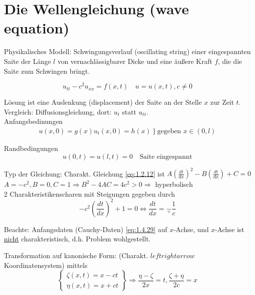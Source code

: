 \section{Die Wellengleichung (wave equation)} %
Physikalisches Modell: Schwingungsverlauf (oscillating string) einer eingespannten Saite der Länge $l$ von vernachlässigbarer Dicke und eine äußere Kraft $f$, die die Saite zum Schwingen bringt. 

\begin{equation} %
    u_{tt} - c^2u_{xx} = f(x,t) \quad u=u(x,t), c\neq 0
    \label{}
\end{equation}

Lösung ist eine Auslenkung (displacement) der Saite an der Stelle $x$ zur Zeit $t$. Vergleich: Diffusionsgleichung, dort: $u_t$ statt $u_{tt}$.\\

Anfangsbedinungen 
\begin{equation} %
    \label{}
    \begin{aligned}
        \left.
            u(x,0) = g(x)
            u_t(x,0) = h(x) 
        \right\} \text{gegeben } x\in(0,l)
    \end{aligned}
\end{equation}

Randbedingungen
\begin{equation} %
    u(0,t) = u(l,t) = 0 \quad \text{Saite eingespannt}
    \label{}
\end{equation}

Typ der Gleichung: Charakt. Gleichung \eqref{eq:1.2.12} ist $A(\frac{dt}{dx})^2 -B(\frac{dt}{dx}) + C = 0$
$A=-c^2, B=0, C=1 \Rightarrow B^2-4AC = 4c^2 > 0 \Rightarrow$  hyperbolisch\\

2 Charakteristikenscharen mit Steigungen gegeben durch 
\begin{equation}
    -c^2 (\frac{dt}{dx})^2 + 1 = 0 \Leftrightarrow \frac{dt}{dx} = \underset{+}{-} \frac{1}{c}
    \label{}
\end{equation}

Beachte: Anfangsdaten (Cauchy-Daten) \eqref{eq:1.4.29} auf $x$-Achse, und $x$-Achse ist \underline{nicht} charakteristisch, d.h. Problem wohlgestellt. 


Transformation auf kanonische Form: (Charakt. $leftrightarrow$ Koordinatensystem) mittels
\begin{equation} %
    \left\{
    \begin{aligned}
        \zeta(x,t) = x-ct\\
        \eta (x,t) = x+ct
    \end{aligned}
\right\} \Rightarrow \frac{\eta-\zeta}{2x} = t, \frac{\zeta+\eta}{2c} = x
\end{equation}

